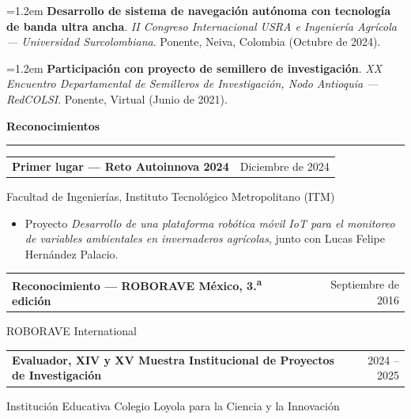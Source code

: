 \documentclass[10pt, letterpaper]{article}
\makeatletter
\newcommand{\SeccionCV}[1]{%
  \needspace{3\baselineskip}%
  \vspace{1.0em}%
  \noindent{\textcolor{AzulITM}{\rule{2.4mm}{2.4mm}}}\hspace{0.5em}%
  {\FuenteTitulo\large\color{AzulITM}\bfseries #1}\\[0.2em]%
  {\color{AzulDigital}\rule{\linewidth}{1.1pt}}%
  \vspace{0.4em}%
}
\newcommand{\ItemCV}[2]{%
  \par\noindent\begin{tabularx}{\linewidth}{@{}X r@{}}
    {\FuenteTitulo\normalsize\color{GrisPizarra}\bfseries #1} &
    {\FuenteCodigo\small\color{GrisMedio}#2}\\
  \end{tabularx}\par\vspace{0.1em}%
}
\newcommand{\Ponencia}[5]{%
  \par\noindent\hangindent=1.2em\hangafter=1
  \textbf{#1}. \textit{#2}. #3, #4 (#5).
  \par\vspace{0.5em}%
}
\makeatother
\begin{document}
\Ponencia{Desarrollo de sistema de navegación autónoma con tecnología de
  banda ultra ancha}%
  {II Congreso Internacional USRA e Ingeniería Agrícola --- Universidad
  Surcolombiana}%
  {Ponente}{Neiva, Colombia}{Octubre de 2024}
\vspace{0.5em}

\Ponencia{Participación con proyecto de semillero de investigación}%
  {XX Encuentro Departamental de Semilleros de Investigación, Nodo
  Antioquia --- RedCOLSI}%
  {Ponente}{Virtual}{Junio de 2021}

\SeccionCV{Reconocimientos}

\ItemCV{Primer lugar --- Reto Autoinnova 2024}{Diciembre de 2024}
Facultad de Ingenierías, Instituto Tecnológico Metropolitano (ITM)
\begin{itemize}
  \item{} Proyecto \textit{Desarrollo de una plataforma robótica móvil IoT
        para el monitoreo de variables ambientales en invernaderos
        agrícolas}, junto con Lucas Felipe Hernández Palacio.
\end{itemize}

\vspace{0.5em}

\ItemCV{Reconocimiento --- ROBORAVE México, 3.\textsuperscript{a} edición}{Septiembre de 2016}
ROBORAVE International

\vspace{0.5em}

\ItemCV{Evaluador, XIV y XV Muestra Institucional de Proyectos de Investigación}{2024 -- 2025}
Institución Educativa Colegio Loyola para la Ciencia y la Innovación
\end{document}
